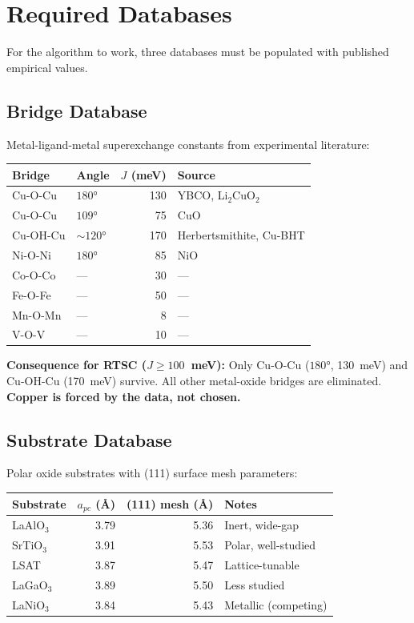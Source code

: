 \documentclass[11pt, a4paper]{article}
\begin{document}
\section{Required Databases}

For the algorithm to work, three databases must be populated with
published empirical values.

\subsection{Bridge Database}

Metal-ligand-metal superexchange constants from experimental
literature:

\begin{center}
\begin{tabular}{@{}llrl@{}}
\toprule
\textbf{Bridge} & \textbf{Angle} & \textbf{$J$ (meV)} &
\textbf{Source} \\
\midrule
Cu-O-Cu & $180°$ & 130 & YBCO, Li$_2$CuO$_2$ \\
Cu-O-Cu & $109°$ & 75 & CuO \\
Cu-OH-Cu & $\sim 120°$ & 170 & Herbertsmithite, Cu-BHT \\
Ni-O-Ni & $180°$ & 85 & NiO \\
Co-O-Co & --- & 30 & --- \\
Fe-O-Fe & --- & 50 & --- \\
Mn-O-Mn & --- & 8 & --- \\
V-O-V & --- & 10 & --- \\
\bottomrule
\end{tabular}
\end{center}

\textbf{Consequence for RTSC ($J \geq 100$~meV):} Only Cu-O-Cu
($180°$, 130~meV) and Cu-OH-Cu (170~meV) survive. All other
metal-oxide bridges are eliminated. \textbf{Copper is forced by
the data, not chosen.}

\subsection{Substrate Database}

Polar oxide substrates with (111) surface mesh parameters:

\begin{center}
\begin{tabular}{@{}lrrl@{}}
\toprule
\textbf{Substrate} & \textbf{$a_{pc}$ (\AA)} &
\textbf{(111) mesh (\AA)} & \textbf{Notes} \\
\midrule
LaAlO$_3$ & 3.79 & 5.36 & Inert, wide-gap \\
SrTiO$_3$ & 3.91 & 5.53 & Polar, well-studied \\
LSAT & 3.87 & 5.47 & Lattice-tunable \\
LaGaO$_3$ & 3.89 & 5.50 & Less studied \\
LaNiO$_3$ & 3.84 & 5.43 & Metallic (competing) \\
\bottomrule
\end{tabular}
\end{center}
\end{document}
